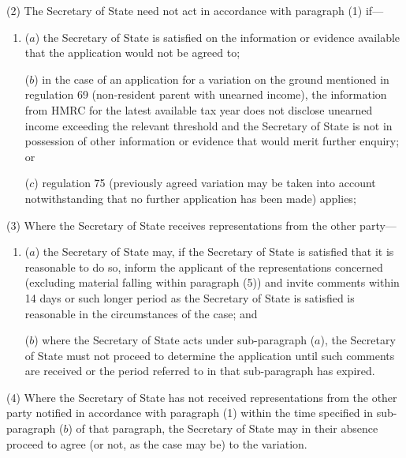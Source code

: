 \documentclass[12pt,a4paper]{article}
\begin{document}
(2) The Secretary of State need not act in accordance with paragraph (1) if—
\begin{enumerate}\item[]
($a$) the Secretary of State is satisfied on the information or evidence available that the application would not be agreed to;

($b$) in the case of an application for a variation on the ground mentioned in regulation 69 (non-resident parent with unearned income), the information from HMRC for the latest available tax year does not disclose unearned income exceeding the relevant threshold and the Secretary of State is not in possession of other information or evidence that would merit further enquiry; or

($c$) regulation 75 (previously agreed variation may be taken into account notwithstanding that no further application has been made) applies;
\end{enumerate}

(3) Where the Secretary of State receives representations from the other party—
\begin{enumerate}\item[]
($a$) the Secretary of State may, if the Secretary of State is satisfied that it is reasonable to do so, inform the applicant of the representations concerned (excluding material falling within paragraph (5)) and invite comments within 14 days or such longer period as the Secretary of State is satisfied is reasonable in the circumstances of the case; and

($b$) where the Secretary of State acts under sub-paragraph ($a$), the Secretary of State must not proceed to determine the application until such comments are received or the period referred to in that sub-paragraph has expired.
\end{enumerate}

(4) Where the Secretary of State has not received representations from the other party notified in accordance with paragraph (1) within the time specified in sub-paragraph ($b$)  of that paragraph, the Secretary of State may in their absence proceed to agree (or not, as the case may be) to the variation.
\end{document}
